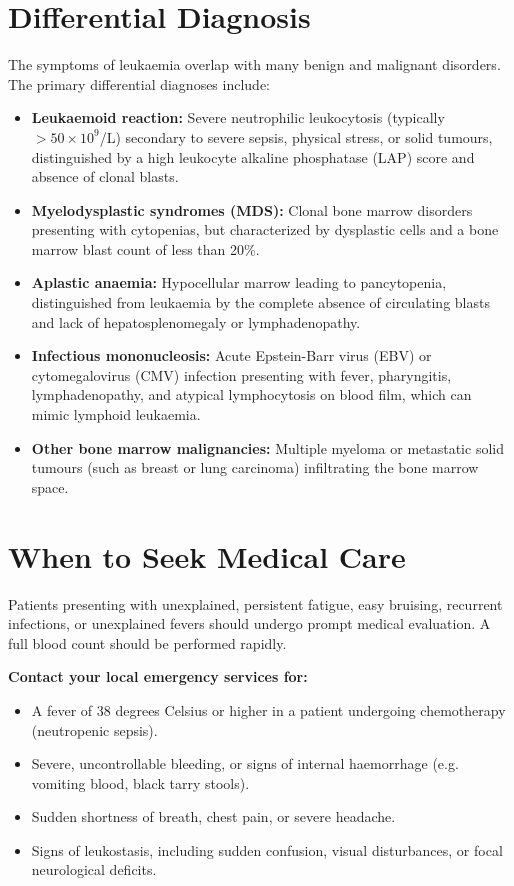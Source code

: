 \section*{Differential Diagnosis}
The symptoms of leukaemia overlap with many benign and malignant disorders. The primary differential diagnoses include:
\begin{itemize}
    \item \textbf{Leukaemoid reaction:} Severe neutrophilic leukocytosis (typically $>50 \times 10^9$/L) secondary to severe sepsis, physical stress, or solid tumours, distinguished by a high leukocyte alkaline phosphatase (LAP) score and absence of clonal blasts.
    \item \textbf{Myelodysplastic syndromes (MDS):} Clonal bone marrow disorders presenting with cytopenias, but characterized by dysplastic cells and a bone marrow blast count of less than 20\%.
    \item \textbf{Aplastic anaemia:} Hypocellular marrow leading to pancytopenia, distinguished from leukaemia by the complete absence of circulating blasts and lack of hepatosplenomegaly or lymphadenopathy.
    \item \textbf{Infectious mononucleosis:} Acute Epstein-Barr virus (EBV) or cytomegalovirus (CMV) infection presenting with fever, pharyngitis, lymphadenopathy, and atypical lymphocytosis on blood film, which can mimic lymphoid leukaemia.
    \item \textbf{Other bone marrow malignancies:} Multiple myeloma or metastatic solid tumours (such as breast or lung carcinoma) infiltrating the bone marrow space.
\end{itemize}

\section*{When to Seek Medical Care}
Patients presenting with unexplained, persistent fatigue, easy bruising, recurrent infections, or unexplained fevers should undergo prompt medical evaluation. A full blood count should be performed rapidly.

\textbf{Contact your local emergency services for:}
\begin{itemize}
    \item A fever of 38 degrees Celsius or higher in a patient undergoing chemotherapy (neutropenic sepsis).
    \item Severe, uncontrollable bleeding, or signs of internal haemorrhage (e.g. vomiting blood, black tarry stools).
    \item Sudden shortness of breath, chest pain, or severe headache.
    \item Signs of leukostasis, including sudden confusion, visual disturbances, or focal neurological deficits.
\end{itemize}

